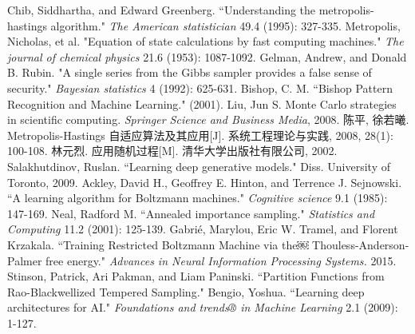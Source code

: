 \documentclass[11pt]{article}
\begin{document}
\newpage
\begin{thebibliography}{1}
Chib, Siddhartha, and Edward Greenberg. ``Understanding the metropolis-hastings algorithm." \emph{The American statistician} 49.4 (1995): 327-335.
Metropolis, Nicholas, et al. "Equation of state calculations by fast computing machines." \emph{The journal of chemical physics }21.6 (1953): 1087-1092.
Gelman, Andrew, and Donald B. Rubin. "A single series from the Gibbs sampler provides a false sense of security." \emph{Bayesian statistics} 4 (1992): 625-631.
Bishop, C. M. ``Bishop Pattern Recognition and Machine Learning." (2001).
Liu, Jun S. Monte Carlo strategies in scientific computing. \emph{Springer Science and Business Media}, 2008.
陈平, 徐若曦. Metropolis-Hastings 自适应算法及其应用[J]. 系统工程理论与实践, 2008, 28(1): 100-108.
林元烈. 应用随机过程[M]. 清华大学出版社有限公司, 2002.
Salakhutdinov, Ruslan. ``Learning deep generative models." Diss. University of Toronto, 2009.
Ackley, David H., Geoffrey E. Hinton, and Terrence J. Sejnowski. ``A learning algorithm for Boltzmann machines." \emph{Cognitive science} 9.1 (1985): 147-169.
Neal, Radford M. ``Annealed importance sampling." \emph{Statistics and Computing} 11.2 (2001): 125-139.
Gabrié, Marylou, Eric W. Tramel, and Florent Krzakala. ``Training Restricted Boltzmann Machine via the￼ Thouless-Anderson-Palmer free energy." \emph{Advances in Neural Information Processing Systems.} 2015.
Stinson, Patrick, Ari Pakman, and Liam Paninski. ``Partition Functions from Rao-Blackwellized Tempered Sampling."
Bengio, Yoshua. ``Learning deep architectures for AI." \emph{Foundations and trends® in Machine Learning} 2.1 (2009): 1-127.
\end{thebibliography}
\end{document}
